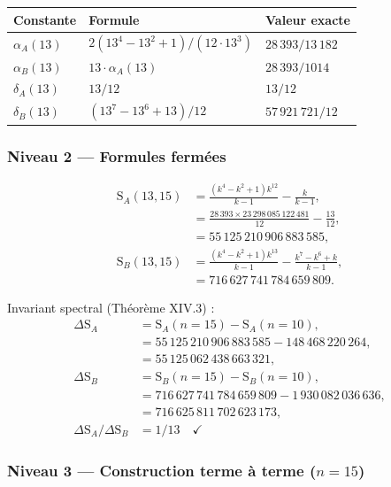 \documentclass[11pt,a4paper]{article}
\newcommand{\SA}{\mathrm{S}_A}
\newcommand{\SB}{\mathrm{S}_B}
\begin{document}
\begin{center}\small
\begin{tabular}{@{}l l l@{}}
\toprule
\rowcolor{spectralgris}
Constante & Formule & Valeur exacte \\
\midrule
$\alpha_A(13)$ & $2(13^{4}-13^{2}+1)/(12\cdot 13^{3})$ & $28\,393/13\,182$ \\
$\alpha_B(13)$ & $13\cdot\alpha_A(13)$ & $28\,393/1014$ \\
$\delta_A(13)$ & $13/12$ & $13/12$ \\
$\delta_B(13)$ & $(13^{7}-13^{6}+13)/12$ & $57\,921\,721/12$ \\
\bottomrule
\end{tabular}
\end{center}

\subsubsection{Niveau 2 --- Formules fermées}
\begin{align*}
\SA(13,15) &= \frac{(k^{4}-k^{2}+1)k^{12}}{k-1}-\frac{k}{k-1},\\
&= \frac{28\,393\times23\,298\,085\,122\,481}{12}-\frac{13}{12},\\
&=55\,125\,210\,906\,883\,585,\\
\SB(13,15) &= \frac{(k^{4}-k^{2}+1)k^{13}}{k-1}
-\frac{k^{7}-k^{6}+k}{k-1},\\
&=716\,627\,741\,784\,659\,809.
\end{align*}

Invariant spectral (Théorème XIV.3) :
\begin{align*}
\Delta\SA &= \SA(n{=}15)-\SA(n{=}10),\\
&=55\,125\,210\,906\,883\,585-148\,468\,220\,264,\\
&=55\,125\,062\,438\,663\,321,\\
\Delta\SB &= \SB(n{=}15)-\SB(n{=}10),\\
&=716\,627\,741\,784\,659\,809-1\,930\,082\,036\,636,\\
&=716\,625\,811\,702\,623\,173,\\
\Delta\SA / \Delta\SB &= 1/13 \quad \checkmark
\end{align*}

\subsubsection{Niveau 3 --- Construction terme à terme ($n = 15$)}
\end{document}
